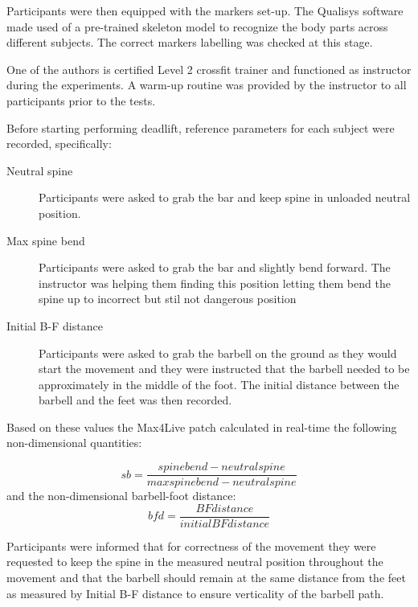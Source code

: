 \documentclass[10pt,letterpaper]{article}
\begin{document}
Participants were then equipped with the markers set-up. The Qualisys software made used of a pre-trained skeleton model to recognize the body parts across different subjects. The correct markers labelling was checked at this stage. 

One of the authors is certified Level 2 crossfit trainer and functioned as instructor during the experiments. A warm-up routine was provided by the instructor to all participants prior to the tests.


Before starting performing deadlift, reference parameters for each subject were recorded, specifically:
\begin{description}
\item[Neutral spine] Participants were asked to grab the bar and keep spine in unloaded neutral position.
\item[Max spine bend] Participants were asked to grab the bar and slightly bend forward. The instructor was helping them finding this position letting them bend the spine up to incorrect but stil not dangerous position
\item[Initial B-F distance] Participants were asked to grab the barbell on the ground as they would start the movement and they were instructed that the barbell needed to be approximately in the middle of the foot. The initial distance between the barbell and the feet was then recorded.
\end{description}

Based on these values the Max4Live patch calculated in real-time the following non-dimensional quantities:

$$  sb=\frac{spine bend - neutral spine}{max spine bend - neutral spine }$$
and the non-dimensional barbell-foot distance:
 $$  bfd = \frac{BF distance}{initial BF distance}$$


Participants were informed that for correctness of the movement they were requested to keep the spine in the measured neutral position throughout the movement and that the barbell should remain at the same distance from the feet as  measured by Initial B-F distance to ensure verticality of the barbell path.
\end{document}
